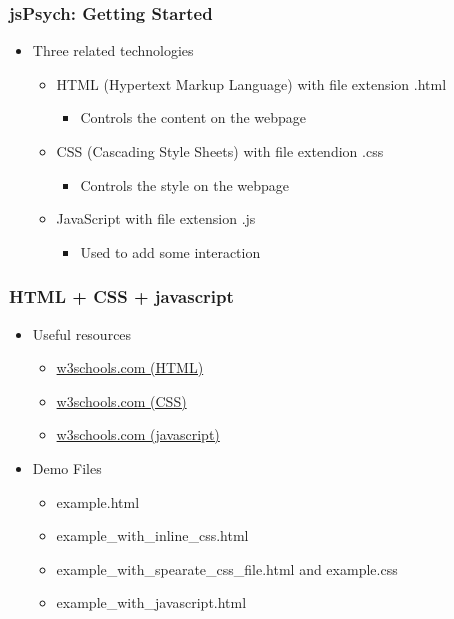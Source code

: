 \documentclass[t]{beamer}
\begin{document}
\begin{frame}[fragile]
    \frametitle{jsPsych: Getting Started}
    \begin{itemize}
        \item Three related technologies 
            \begin{itemize}
                \item HTML (Hypertext Markup Language) with file extension .html 
                    \begin{itemize}
                        \item Controls the content on the webpage
                    \end{itemize}
                \item CSS (Cascading Style Sheets) with file extendion .css
                    \begin{itemize}
                        \item Controls the style on the webpage
                    \end{itemize}
                \item JavaScript with file extension .js
                    \begin{itemize}
                        \item Used to add some interaction
                    \end{itemize}
            \end{itemize}
    \end{itemize}
\end{frame}


\begin{frame}[fragile]
    \frametitle{HTML + CSS + javascript}
    \begin{itemize}
        \item Useful resources
            \begin{itemize}
                \item \href{https://www.w3schools.com/html/default.asp}{w3schools.com (HTML)}
                \item \href{https://www.w3schools.com/css/default.asp}{w3schools.com (CSS)}
                \item \href{https://www.w3schools.com/js/DEFAULT.asp}{w3schools.com (javascript)}
            \end{itemize}
        \item Demo Files
            \begin{itemize}
                \item example.html
                \item example\_with\_inline\_css.html
                \item example\_with\_spearate\_css\_file.html and example.css
                \item example\_with\_javascript.html
            \end{itemize}
    \end{itemize}
\end{frame}
\end{document}
